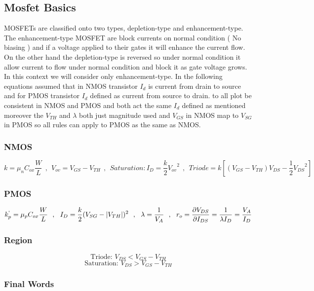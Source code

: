\subsection{Mosfet Basics}
MOSFETs are classified onto two types, depletion-type and enhancement-type. The enhancement-type MOSFET are block currents on normal condition ( No biasing ) and if a voltage applied to their gates it will enhance the current flow. On the other hand the depletion-type is reversed so under normal condition it allow current to flow under normal condition and block it as gate voltage grows. In this context we will consider only enhancement-type. In the following equations assumed that in NMOS transistor $I_d$ is current from drain to source and for PMOS transistor $I_d$ defined as current from source to drain. to all plot be consistent in NMOS and PMOS and both act the same $I_d$ defined as mentioned moreover the $V_{TH}$ and $\lambda$ both just magnitude used and $V_{GS}$ in NMOS map to $V_{SG}$ in PMOS so all  rules can apply to PMOS as the same as NMOS.
\subsubsection{NMOS}
$$ k = {\mu}_n C_{ox} \frac{W}{L} ~~ , ~~ V_{ov} = V_{GS} - V_{TH} ~~, ~~  Saturation: I_D = \frac{k}{2} {V_{ov}}^2 ~~,~~ Triode = k [(V_{GS} - V_{TH})V_{DS} - \frac{1}{2}{V_{DS}}^2]$$
\par
\subsubsection{PMOS}
$$ k^{`}_p = {\mu}_p C_{ox} \frac{W}{L} ~~, ~~ I_D = \frac{k}{2} (V_{SG} - |V_{TH}|)^2 ~~,~~ 
\lambda = \frac{1}{V_A} ~~, ~~ r_o = \frac{\partial V_{DS}}{\partial I_{DS}} = \frac{1}{\lambda  I_D} = \frac{V_A}{I_D}$$
\subsubsection{Region}
$$ \text{Triode:~} V_{DS} < V_{GS} - V_{TH} $$
$$ \text{Saturation:~} V_{DS} > V_{GS} - V_{TH} $$
\subsubsection{Final Words}
\lipsum[60-62]
